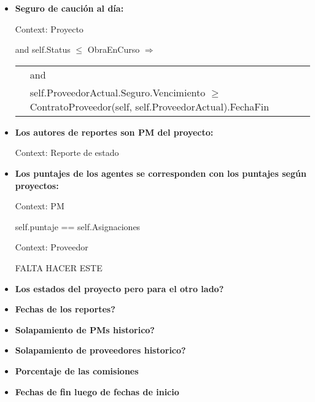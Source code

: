 \begin{itemize}
	\item \textbf{Seguro de caución al día:}
	
			Context: Proyecto
			
			 and self.Status $\leq$ ObraEnCurso $\Rightarrow$
			
			\begin{tabular}{ll}
				\hfill
				& \notEmpty{self.ProveedorActual.Seguro} and	\\
				& self.ProveedorActual.Seguro.Vencimiento $\geq$ ContratoProveedor(self, self.ProveedorActual).FechaFin	\\
			\end{tabular}
				
	\item \textbf{Los autores de reportes son PM del proyecto:}
		
			Context: Reporte de estado 
			
	
	\item \textbf{Los puntajes de los agentes se corresponden con los puntajes seg\'un proyectos:}
			
			Context: PM
			
			self.puntaje == self.Asignaciones
				
				
				
			Context: Proveedor
			
			FALTA HACER ESTE
	
	\item \textbf{Los estados del proyecto pero para el otro lado?}
	\item \textbf{Fechas de los reportes?}
	\item \textbf{Solapamiento de PMs historico?}
	\item \textbf{Solapamiento de proveedores historico?}
	\item \textbf{Porcentaje de las comisiones}
	\item \textbf{Fechas de fin luego de fechas de inicio}
	
\end{itemize}
